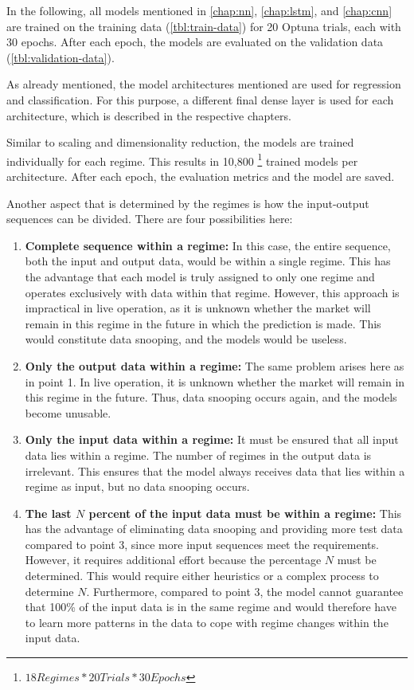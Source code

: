 In the following, all models mentioned in \autoref{chap:nn}, \autoref{chap:lstm}, and \autoref{chap:cnn} are trained on the training data (\autoref{tbl:train-data}) for 20 Optuna trials, each with 30 epochs.
After each epoch, the models are evaluated on the validation data (\autoref{tbl:validation-data}).

As already mentioned, the model architectures mentioned are used for regression and classification.
For this purpose, a different final dense layer is used for each architecture, which is described in the respective chapters.

Similar to scaling and dimensionality reduction, the models are trained individually for each regime.
This results in 10,800 \footnote{$18 Regimes * 20 Trials * 30 Epochs$} trained models per architecture.
After each epoch, the evaluation metrics and the model are saved.

Another aspect that is determined by the regimes is how the input-output sequences can be divided.
There are four possibilities here:

\begin{enumerate}
    \item \textbf{Complete sequence within a regime:} In this case, the entire sequence, both the input and output data, would be within a single regime.
    This has the advantage that each model is truly assigned to only one regime and operates exclusively with data within that regime.
    However, this approach is impractical in live operation, as it is unknown whether the market will remain in this regime in the future in which the prediction is made.
    This would constitute data snooping, and the models would be useless.
    \item \textbf{Only the output data within a regime:} The same problem arises here as in point 1.
    In live operation, it is unknown whether the market will remain in this regime in the future.
    Thus, data snooping occurs again, and the models become unusable.
    \item \textbf{Only the input data within a regime:} It must be ensured that all input data lies within a regime.
    The number of regimes in the output data is irrelevant.
    This ensures that the model always receives data that lies within a regime as input, but no data snooping occurs.
    \item \textbf{The last $N$ percent of the input data must be within a regime:} This has the advantage of eliminating data snooping and providing more test data compared to point 3, since more input sequences meet the requirements.
    However, it requires additional effort because the percentage $N$ must be determined.
    This would require either heuristics or a complex process to determine $N$.
    Furthermore, compared to point 3, the model cannot guarantee that 100\% of the input data is in the same regime and would therefore have to learn more patterns in the data to cope with regime changes within the input data.
\end{enumerate}


